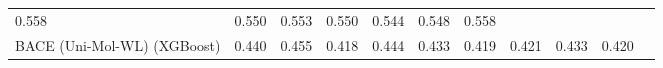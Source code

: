 \documentclass[
  10pt,
]{article}
\begin{document}
\begin{longtable}[]{@{}lllllllllll@{}}
\begin{minipage}[t]{0.07\columnwidth}
0.558\strut
\end{minipage} & \begin{minipage}[t]{0.07\columnwidth}\raggedright
0.550\strut
\end{minipage} & \begin{minipage}[t]{0.07\columnwidth}\raggedright
0.553\strut
\end{minipage} & \begin{minipage}[t]{0.07\columnwidth}\raggedright
0.550\strut
\end{minipage} & \begin{minipage}[t]{0.07\columnwidth}\raggedright
0.544\strut
\end{minipage} & \begin{minipage}[t]{0.07\columnwidth}\raggedright
0.548\strut
\end{minipage} & \begin{minipage}[t]{0.07\columnwidth}\raggedright
0.558\strut
\end{minipage}\tabularnewline
\begin{minipage}[t]{0.07\columnwidth}\raggedright
BACE (Uni-Mol-WL) (XGBoost)\strut
\end{minipage} & \begin{minipage}[t]{0.07\columnwidth}\raggedright
0.440\strut
\end{minipage} & \begin{minipage}[t]{0.07\columnwidth}\raggedright
0.455\strut
\end{minipage} & \begin{minipage}[t]{0.07\columnwidth}\raggedright
0.418\strut
\end{minipage} & \begin{minipage}[t]{0.07\columnwidth}\raggedright
0.444\strut
\end{minipage} & \begin{minipage}[t]{0.07\columnwidth}\raggedright
0.433\strut
\end{minipage} & \begin{minipage}[t]{0.07\columnwidth}\raggedright
0.419\strut
\end{minipage} & \begin{minipage}[t]{0.07\columnwidth}\raggedright
0.421\strut
\end{minipage} & \begin{minipage}[t]{0.07\columnwidth}\raggedright
0.433\strut
\end{minipage} & \begin{minipage}[t]{0.07\columnwidth}\raggedright
0.420\strut
\end{minipage} & \begin{minipage}[t]{0.07\columnwidth}\raggedright

\end{minipage}
\end{longtable}
\end{document}
